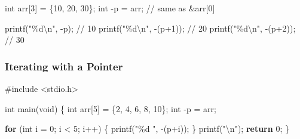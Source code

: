 \documentclass[
  letterpaper,
  DIV=11,
  numbers=noendperiod]{scrreprt}
\newenvironment{Shaded}{\begin{snugshade}}{\end{snugshade}}
\newcommand{\CommentTok}[1]{\textcolor[rgb]{0.37,0.37,0.37}{#1}}
\newcommand{\ControlFlowTok}[1]{\textcolor[rgb]{0.00,0.23,0.31}{\textbf{#1}}}
\newcommand{\DataTypeTok}[1]{\textcolor[rgb]{0.68,0.00,0.00}{#1}}
\newcommand{\DecValTok}[1]{\textcolor[rgb]{0.68,0.00,0.00}{#1}}
\newcommand{\ImportTok}[1]{\textcolor[rgb]{0.00,0.46,0.62}{#1}}
\newcommand{\NormalTok}[1]{\textcolor[rgb]{0.00,0.23,0.31}{#1}}
\newcommand{\OperatorTok}[1]{\textcolor[rgb]{0.37,0.37,0.37}{#1}}
\newcommand{\PreprocessorTok}[1]{\textcolor[rgb]{0.68,0.00,0.00}{#1}}
\newcommand{\SpecialCharTok}[1]{\textcolor[rgb]{0.37,0.37,0.37}{#1}}
\newcommand{\StringTok}[1]{\textcolor[rgb]{0.13,0.47,0.30}{#1}}
\begin{document}
\begin{Shaded}
\begin{Highlighting}[]
\DataTypeTok{int}\NormalTok{ arr}\OperatorTok{[}\DecValTok{3}\OperatorTok{]} \OperatorTok{=} \OperatorTok{\{}\DecValTok{10}\OperatorTok{,} \DecValTok{20}\OperatorTok{,} \DecValTok{30}\OperatorTok{\};}
\DataTypeTok{int} \OperatorTok{{-}}\NormalTok{p }\OperatorTok{=}\NormalTok{ arr}\OperatorTok{;}     \CommentTok{// same as \&arr[0]}

\NormalTok{printf}\OperatorTok{(}\StringTok{"}\SpecialCharTok{\%d\textbackslash{}n}\StringTok{"}\OperatorTok{,} \OperatorTok{{-}}\NormalTok{p}\OperatorTok{);}     \CommentTok{// 10}
\NormalTok{printf}\OperatorTok{(}\StringTok{"}\SpecialCharTok{\%d\textbackslash{}n}\StringTok{"}\OperatorTok{,} \OperatorTok{{-}(}\NormalTok{p}\OperatorTok{+}\DecValTok{1}\OperatorTok{));} \CommentTok{// 20}
\NormalTok{printf}\OperatorTok{(}\StringTok{"}\SpecialCharTok{\%d\textbackslash{}n}\StringTok{"}\OperatorTok{,} \OperatorTok{{-}(}\NormalTok{p}\OperatorTok{+}\DecValTok{2}\OperatorTok{));} \CommentTok{// 30}
\end{Highlighting}
\end{Shaded}

\subsubsection{Iterating with a Pointer}\label{iterating-with-a-pointer}

\begin{Shaded}
\begin{Highlighting}[]
\PreprocessorTok{\#include }\ImportTok{\textless{}stdio.h\textgreater{}}

\DataTypeTok{int}\NormalTok{ main}\OperatorTok{(}\DataTypeTok{void}\OperatorTok{)} \OperatorTok{\{}
    \DataTypeTok{int}\NormalTok{ arr}\OperatorTok{[}\DecValTok{5}\OperatorTok{]} \OperatorTok{=} \OperatorTok{\{}\DecValTok{2}\OperatorTok{,} \DecValTok{4}\OperatorTok{,} \DecValTok{6}\OperatorTok{,} \DecValTok{8}\OperatorTok{,} \DecValTok{10}\OperatorTok{\};}
    \DataTypeTok{int} \OperatorTok{{-}}\NormalTok{p }\OperatorTok{=}\NormalTok{ arr}\OperatorTok{;}

    \ControlFlowTok{for} \OperatorTok{(}\DataTypeTok{int}\NormalTok{ i }\OperatorTok{=} \DecValTok{0}\OperatorTok{;}\NormalTok{ i }\OperatorTok{\textless{}} \DecValTok{5}\OperatorTok{;}\NormalTok{ i}\OperatorTok{++)} \OperatorTok{\{}
\NormalTok{        printf}\OperatorTok{(}\StringTok{"}\SpecialCharTok{\%d}\StringTok{ "}\OperatorTok{,} \OperatorTok{{-}(}\NormalTok{p}\OperatorTok{+}\NormalTok{i}\OperatorTok{));}
    \OperatorTok{\}}
\NormalTok{    printf}\OperatorTok{(}\StringTok{"}\SpecialCharTok{\textbackslash{}n}\StringTok{"}\OperatorTok{);}
    \ControlFlowTok{return} \DecValTok{0}\OperatorTok{;}
\OperatorTok{\}}
\end{Highlighting}
\end{Shaded}
\end{document}
